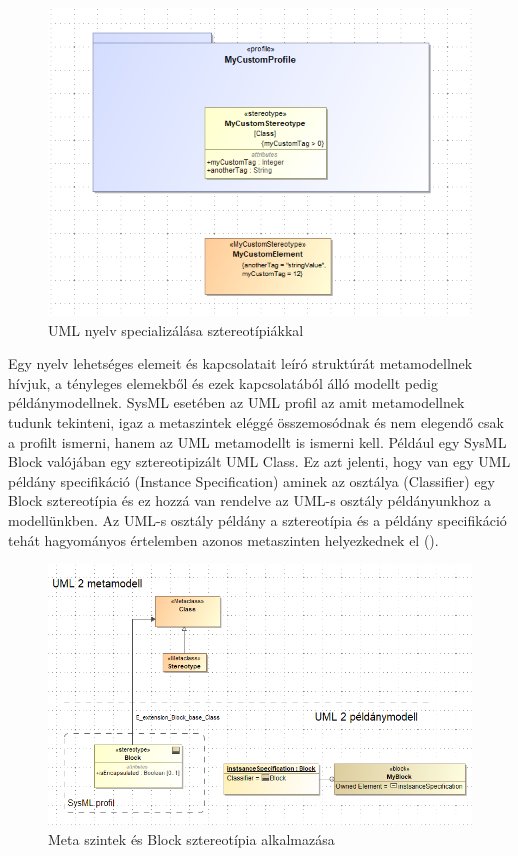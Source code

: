 \begin{figure}[!ht]
	\centering
	\includegraphics[width=150mm, keepaspectratio]{figures/preliminaries/custom-profile.png}
	\caption{UML nyelv specializálása sztereotípiákkal}
	\label{fig:custom-profile}
\end{figure}

Egy nyelv lehetséges elemeit és kapcsolatait leíró struktúrát metamodellnek hívjuk, a tényleges elemekből és ezek kapcsolatából álló modellt pedig példánymodellnek.  SysML esetében az UML profil az amit metamodellnek tudunk tekinteni, igaz a metaszintek eléggé összemosódnak és nem elegendő csak a profilt ismerni, hanem az UML metamodellt is ismerni kell. Például egy SysML Block valójában egy sztereotipizált UML Class. Ez azt jelenti, hogy van egy UML példány specifikáció (Instance Specification) aminek az osztálya (Classifier) egy Block sztereotípia és ez hozzá van rendelve az UML-s osztály példányunkhoz a modellünkben. Az UML-s osztály példány a sztereotípia és a példány specifikáció tehát hagyományos értelemben azonos metaszinten helyezkednek el ().

\begin{figure}[!ht]
	\centering
	\includegraphics[width=150mm, keepaspectratio]{figures/preliminaries/block-stereotype.png}
	\caption{Meta szintek és Block sztereotípia alkalmazása}
	\label{fig:block-stereotype}
\end{figure}

